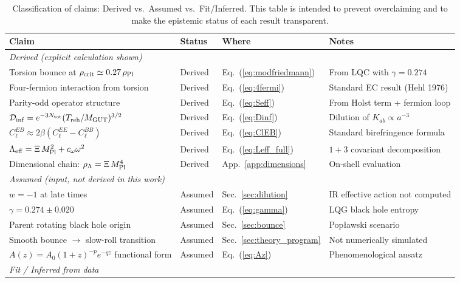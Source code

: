 \documentclass[aps,prd,twocolumn,superscriptaddress,showpacs,preprintnumbers,nofootinbib,longbibliography,floatfix]{revtex4-2}
\newcommand{\Leff}{\Lambda_{\rm eff}}
\newcommand{\Dinf}{\mathcal{D}_{\rm inf}}
\newcommand{\rhocrit}{\rho_{\rm crit}}
\newcommand{\rhoPl}{\rho_{\rm Pl}}
\newcommand{\MPl}{M_{\rm Pl}}
\begin{document}
\begin{table}[t]
\caption{\label{tab:claims} Classification of claims: Derived vs.\ Assumed vs.\ Fit/Inferred. This table is intended to prevent overclaiming and to make the epistemic status of each result transparent.}
\begin{ruledtabular}
\begin{tabular}{llll}
\textbf{Claim} & \textbf{Status} & \textbf{Where} & \textbf{Notes} \\
\hline
\multicolumn{4}{l}{\textit{Derived (explicit calculation shown)}} \\
Torsion bounce at $\rhocrit \simeq 0.27\,\rhoPl$ & Derived & Eq.~(\ref{eq:modfriedmann}) & From LQC with $\gamma = 0.274$ \\
Four-fermion interaction from torsion & Derived & Eq.~(\ref{eq:4fermi}) & Standard EC result (Hehl 1976) \\
Parity-odd operator structure & Derived & Eq.~(\ref{eq:Seff}) & From Holst term + fermion loop \\
$\Dinf = e^{-3N_{\rm tot}}(T_{\rm reh}/M_{\rm GUT})^{3/2}$ & Derived & Eq.~(\ref{eq:Dinf}) & Dilution of $K_{ab} \propto a^{-3}$ \\
$C_\ell^{EB} \approx 2\beta(C_\ell^{EE} - C_\ell^{BB})$ & Derived & Eq.~(\ref{eq:ClEB}) & Standard birefringence formula \\
$\Leff = \Xi\,\MPl^2 + c_\omega\omega^2$ & Derived & Eq.~(\ref{eq:Leff_full}) & $1+3$ covariant decomposition \\
Dimensional chain: $\rho_\Lambda = \Xi\,\MPl^4$ & Derived & App.~\ref{app:dimensions} & On-shell evaluation \\
\hline
\multicolumn{4}{l}{\textit{Assumed (input, not derived in this work)}} \\
$w = -1$ at late times & Assumed & Sec.~\ref{sec:dilution} & IR effective action not computed \\
$\gamma = 0.274 \pm 0.020$ & Assumed & Eq.~(\ref{eq:gamma}) & LQG black hole entropy \\
Parent rotating black hole origin & Assumed & Sec.~\ref{sec:bounce} & Pop\l{}awski scenario \\
Smooth bounce $\to$ slow-roll transition & Assumed & Sec.~\ref{sec:theory_program} & Not numerically simulated \\
$A(z) = A_0(1+z)^{-p}e^{-qz}$ functional form & Assumed & Eq.~(\ref{eq:Az}) & Phenomenological ansatz \\
\hline
\multicolumn{4}{l}{\textit{Fit / Inferred from data}} \\

\end{tabular}
\end{ruledtabular}
\end{table}
\end{document}
